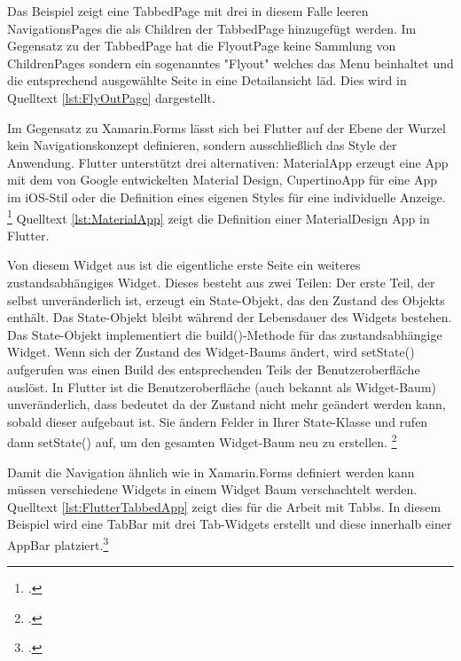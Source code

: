 Das Beispiel zeigt eine TabbedPage mit drei in diesem Falle leeren NavigationsPages die als Children der TabbedPage hinzugefügt werden.  Im Gegensatz zu der TabbedPage hat die FlyoutPage keine Sammlung von ChildrenPages sondern ein sogenanntes "Flyout" welches das Menu beinhaltet und die entsprechend ausgewählte Seite in eine Detailansicht läd.  Dies wird in Quelltext \ref{lst:FlyOutPage} dargestellt.

\begin{minipage}{\linewidth}

\end{minipage}

Im Gegensatz zu Xamarin.Forms lässt sich bei Flutter auf der Ebene der Wurzel kein Navigationskonzept definieren,  sondern ausschließlich das Style der Anwendung.  Flutter unterstützt drei alternativen: MaterialApp erzeugt eine App mit dem von Google entwickelten Material Design, CupertinoApp für eine App im iOS-Stil oder die Definition eines eigenen Styles für eine individuelle Anzeige.  \footcite[Vgl.][Abgerufen am \today]{GoogleFlutterPages2020}  Quelltext \ref{lst:MaterialApp} zeigt die Definition einer MaterialDesign App in Flutter.

\begin{minipage}{\linewidth}

\end{minipage}

Von diesem Widget aus ist die eigentliche erste Seite ein weiteres zustandsabhängiges Widget.  Dieses besteht aus zwei Teilen:  Der erste Teil, der selbst unveränderlich ist, erzeugt ein State-Objekt, das den Zustand des Objekts enthält.  Das State-Objekt bleibt während der Lebensdauer des Widgets bestehen. Das State-Objekt implementiert die build()-Methode für das zustandsabhängige Widget.  Wenn sich der Zustand des Widget-Baums ändert,  wird setState() aufgerufen was einen Build des entsprechenden Teils der Benutzeroberfläche auslöst.  In Flutter ist die Benutzeroberfläche (auch bekannt als Widget-Baum) unveränderlich,  dass bedeutet da der Zustand nicht mehr geändert werden kann, sobald dieser aufgebaut ist.  Sie ändern Felder in Ihrer State-Klasse und rufen dann setState() auf, um den gesamten Widget-Baum neu zu erstellen. \footcite[Vgl.][Abgerufen am \today]{GoogleFlutterSharedPreferences2020} 

Damit die Navigation ähnlich wie in Xamarin.Forms definiert werden kann müssen verschiedene Widgets in einem Widget Baum verschachtelt werden.  Quelltext \ref{lst:FlutterTabbedApp} zeigt dies für die Arbeit mit Tabbs.  In diesem Beispiel wird eine TabBar mit drei Tab-Widgets erstellt und diese innerhalb einer AppBar platziert.\footcite[Vgl.][Abgerufen am \today]{GoogleFlutterTabs2020} 


